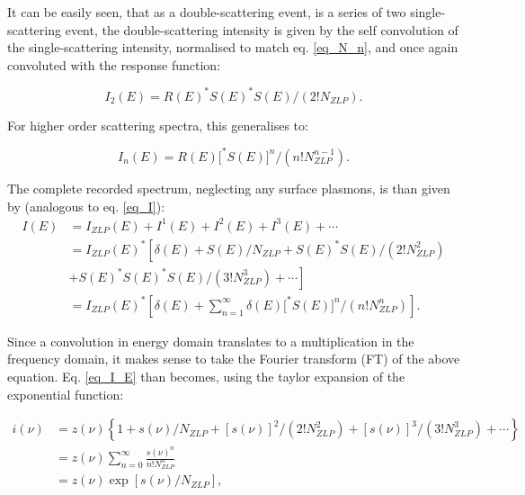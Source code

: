 It can be easily seen, that as a double-scattering event, is a series of two single-scattering event, the double-scattering intensity is given by the self convolution of the single-scattering intensity, normalised to match eq. \eqref{eq_N_n}, and once again convoluted with the response function:

\begin{equation}
    I_{2}(E)=R(E)^{*} S(E)^{*} S(E) /\left(2 ! N_{ZLP}\right).
\end{equation}

For higher order scattering spectra, this generalises to:


\begin{equation} \label{eq_def_I_n}
    I_{n}(E)=R(E)\big[^{*} S(E)\big]^{n} /\left(n ! N_{ZLP}^{n-1}\right).
\end{equation}

The complete recorded spectrum, neglecting any surface plasmons, is than given by (analogous to eq. \eqref{eq_I}):
\begin{equation} \label{eq_I_E}
    \begin{aligned}
        I(E) &=I_{ZLP}(E)+I^{1}(E)+I^{2}(E)+I^{3}(E)+\cdots \\
        &=I_{ZLP}(E)^{*}\left[\delta(E)+S(E) / N_{ZLP}+S(E)^{*} S(E) /\left(2 ! N_{ZLP}^{2}\right)\right.\\
        &\left.+S(E)^{*} S(E)^{*} S(E) /\left(3 ! N_{ZLP}^{3}\right)+\cdots\right]\\
        &= I_{ZLP}(E)^{*}\left[\delta(E)+ \sum_{n=1}^\infty \delta(E)\big[^{*} S(E)\big]^{n} /\left(n ! N_{ZLP}^{n}\right) \right].
        \end{aligned}
\end{equation}

Since a convolution in energy domain translates to a multiplication in the frequency domain, it makes sense to take the Fourier transform (FT) of the above equation. Eq. \eqref{eq_I_E} than becomes, using the taylor expansion of the exponential function:

\begin{equation}\label{eq_i_nu_exp}
    \begin{aligned}
i(\nu) &=z(\nu)\left\{1+s(\nu) / N_{ZLP}+[s(\nu)]^{2} /\left(2 ! N_{ZLP}^{2}\right)+[s(\nu)]^{3} /\left(3 ! N_{ZLP}^{3}\right)+\cdots\right\} \\
&=z(\nu)\sum_{n=0}^\infty\frac{s(\nu)^n}{n! N_{ZLP}^n}\\
&=z(\nu) \exp \left[s(\nu) / N_{ZLP}\right],
\end{aligned}
\end{equation}

